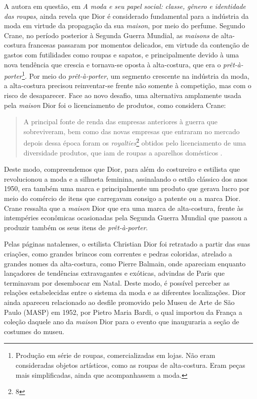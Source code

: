 \begin{refsection}
    A autora em questão, em \textit{A moda e seu papel social: classe, gênero e identidade das roupas}, ainda revela que Dior é considerado fundamental para a indústria da moda em virtude da propagação da sua \textit{maison}, por meio do perfume. Segundo Crane, no período posterior à Segunda Guerra Mundial, as \textit{maisons} de alta-costura francesas passaram por momentos delicados, em virtude da contenção de gastos com futilidades como roupas e sapatos, e principalmente devido à uma nova tendência que crescia e tornava-se oposta à alta-costura, que era o \textit{prêt-à-porter}\footnote{Produção em série de roupas, comercializadas em lojas. Não eram consideradas objetos artísticos, como as roupas de alta-costura. Eram peças mais simplificadas, ainda que acompanhassem a moda.}. Por meio do \textit{prêt-à-porter}, um segmento crescente na indústria da moda, a alta-costura precisou reinventar-se frente não somente à competição, mas com o risco de desaparecer. Face ao novo desafio, uma alternativa amplamente usada pela \textit{maison} Dior foi o licenciamento de produtos, como considera Crane:

    \begin{quotation}
        A principal fonte de renda das empresas anteriores à guerra que sobreviveram, bem como das novas empresas que entraram no mercado depois dessa época foram os \textit{royalties}\footnote{8} obtidos pelo licenciamento de uma diversidade produtos, que iam de roupas a aparelhos domésticos \citeyear[p.~286]{Crane2006Moda}.
    \end{quotation}

    Deste modo, compreendemos que Dior, para além do costureiro e estilista que revolucionou a moda e a silhueta feminina, assinalando o estilo clássico dos anos 1950, era também uma marca e principalmente um produto que gerava lucro por meio do comércio de itens que carregavam consigo a patente ou a marca Dior. Crane ressalta que a \textit{maison} Dior que era uma marca de alta-costura, frente às intempéries econômicas ocasionadas pela Segunda Guerra Mundial que passou a produzir também os seus itens de \textit{prêt-à-porter}.

    Pelas páginas natalenses, o estilista Christian Dior foi retratado a partir das suas criações, como grandes brincos com correntes e pedras coloridas, atrelado a grandes nomes da alta-costura, como Pierre Balmain, onde apareciam enquanto lançadores de tendências extravagantes e exóticas, advindas de Paris que terminavam por desembocar em Natal. Deste modo, é possível perceber as relações estabelecidas entre o sistema da moda e as diferentes localizações. Dior ainda apareceu relacionado ao desfile promovido pelo Museu de Arte de São Paulo (MASP) em 1952, por Pietro Maria Bardi, o qual importou da França a coleção daquele ano da \textit{maison} Dior para o evento que inauguraria a seção de costumes do museu.


\end{refsection}
